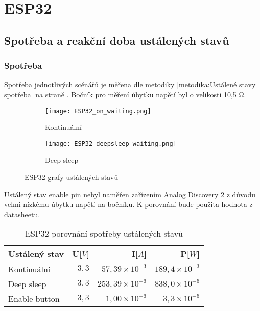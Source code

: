 \documentclass[a4paper, 12pt]{report}
\begin{document}
		\section{ESP32}
			\subsection{Spotřeba a reakční doba ustálených stavů}
				\subsubsection{Spotřeba}
				Spotřeba jednotlivých scénářů je měřena dle metodiky \ref{metodika:Ustálené stavy spotřeba} na straně \pageref{metodika:Ustálené stavy spotřeba}. Bočník pro měření úbytku napětí byl o velikosti 10,5 \si{\ohm}.\\
				\begin{figure}[h]
					\centering
					\begin{subfigure}[b]{0.4\linewidth}
						\texttt{[image: ESP32\_on\_waiting.png]}
						\caption{Kontinuální}
					\end{subfigure}
					\begin{subfigure}[b]{0.4\linewidth}
						\texttt{[image: ESP32\_deepsleep\_waiting.png]}
						\caption{Deep sleep}
					\end{subfigure}
					\caption{ESP32 grafy ustálených stavů}
					\label{ESP32 waiting}
				\end{figure}
				Ustálený stav enable pin nebyl naměřen zařízením Analog Discovery 2 z důvodu velmi nízkému úbytku napětí na bočníku. K porovnání bude použita hodnota z datasheetu.
				\begin{table}[h]
					\centering
					\caption{ESP32 porovnání spotřeby ustálených stavů}
					\begin{tabular}{||l|r r r||}
						\hline
						Ustálený stav & U[$V$] & I[$A$] & P[$W$]\\
						\hline
						Kontinuální & $3,3$& $57,39 \times 10^{-3}$ & $189,4 \times 10^{-3}$\\
						Deep sleep& $3,3$ & $253,39 \times 10^{-6}$  & $838,0 \times 10^{-6}$\\
						Enable button & $3,3$ & $1,00\times 10^{-6}$ & $3,3\times 10^{-6}$\\
						\hline
					\end{tabular}
					\label{ESP32 klidové režimy spotřeba}
				\end{table}
\end{document}
